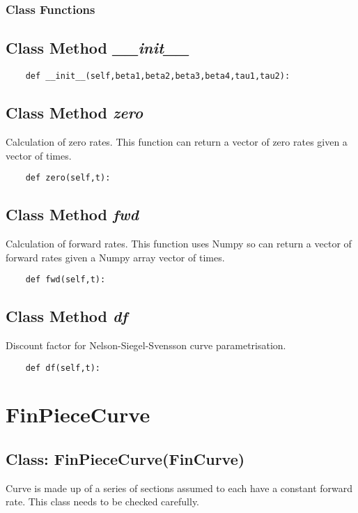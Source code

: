 \documentclass[twoside,11pt]{book}
\begin{document}
\subsubsection{Class Functions}

\subsection{Class Method {\it \_\_init\_\_}}


\begin{lstlisting}
    def __init__(self,beta1,beta2,beta3,beta4,tau1,tau2):
\end{lstlisting}

\subsection{Class Method {\it zero}}
Calculation of zero rates. This function can return a vector of zero rates given a vector of times. 

\begin{lstlisting}
    def zero(self,t):
\end{lstlisting}

\subsection{Class Method {\it fwd}}
Calculation of forward rates. This function uses Numpy so can return a vector of forward rates given a Numpy array vector of times. 

\begin{lstlisting}
    def fwd(self,t):
\end{lstlisting}

\subsection{Class Method {\it df}}
Discount factor for Nelson-Siegel-Svensson curve parametrisation. 

\begin{lstlisting}
    def df(self,t):
\end{lstlisting}

\newpage
\section{FinPieceCurve}

\subsection{Class: FinPieceCurve(FinCurve)}
Curve is made up of a series of sections assumed to each have a constant forward rate. This class needs to be checked carefully. 
\end{document}
